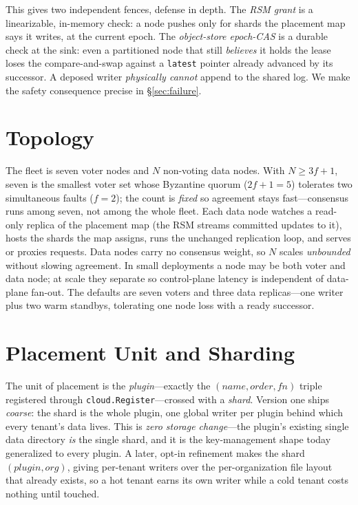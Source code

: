 \documentclass[11pt]{article}
\begin{document}
This gives two independent fences, defense in depth. The \emph{RSM grant} is
a linearizable, in-memory check: a node pushes only for shards the placement
map says it writes, at the current epoch. The \emph{object-store epoch-CAS}
is a durable check at the sink: even a partitioned node that still
\emph{believes} it holds the lease loses the compare-and-swap against a
\texttt{latest} pointer already advanced by its successor. A deposed writer
\emph{physically cannot} append to the shared log. We make the safety
consequence precise in \S\ref{sec:failure}.

\section{Topology}
\label{sec:topology}

The fleet is seven voter nodes and $N$ non-voting data nodes. With
$N \ge 3f+1$, seven is the smallest voter set whose Byzantine quorum
($2f+1 = 5$) tolerates two simultaneous faults ($f=2$);
the count is \emph{fixed} so agreement stays fast---consensus runs among seven,
not among the whole fleet. Each data node watches a read-only replica of the
placement map (the RSM streams committed updates to it), hosts the shards the
map assigns, runs the unchanged replication loop, and serves or proxies
requests. Data nodes carry no consensus weight, so $N$ scales \emph{unbounded}
without slowing agreement. In small deployments a node may be both voter and
data node; at scale they separate so control-plane latency is independent of
data-plane fan-out. The defaults are seven voters and three data replicas---one
writer plus two warm standbys, tolerating one node loss with a ready
successor.

\section{Placement Unit and Sharding}
\label{sec:shard}

The unit of placement is the \emph{plugin}---exactly the
$(\textit{name},\textit{order},\textit{fn})$ triple registered through
\texttt{cloud.Register}---crossed with a \emph{shard}. Version one ships
\emph{coarse}: the shard is the whole plugin, one global writer per plugin
behind which every tenant's data lives. This is \emph{zero storage change}---the
plugin's existing single data directory \emph{is} the single shard, and it is
the key-management shape today generalized to every plugin. A later, opt-in
refinement makes the shard $(\textit{plugin},\textit{org})$, giving per-tenant
writers over the per-organization file layout~\cite{hip0302} that already
exists, so a hot tenant earns its own writer while a cold tenant costs
nothing until touched.
\end{document}
